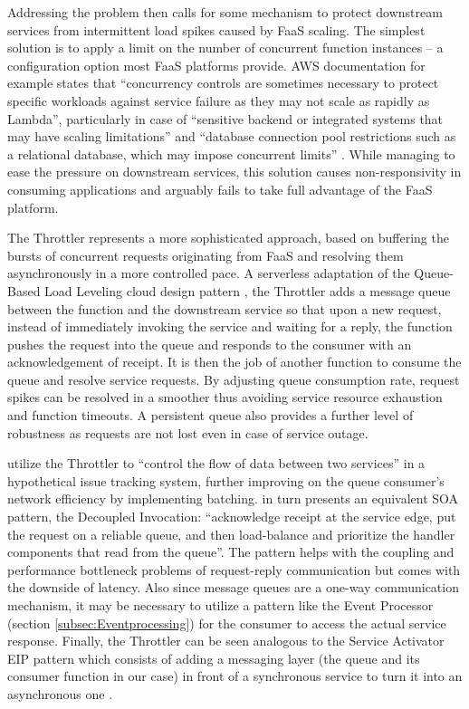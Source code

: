 Addressing the problem then calls for some mechanism to protect downstream services from intermittent load spikes caused by FaaS scaling. The simplest solution is to apply a limit on the number of concurrent function instances -- a configuration option most FaaS platforms provide. AWS documentation for example states that ``concurrency controls are sometimes necessary to protect specific workloads against service failure as they may not scale as rapidly as Lambda'', particularly in case of ``sensitive backend or integrated systems that may have scaling limitations'' and ``database connection pool restrictions such as a relational database, which may impose concurrent limits'' \parencite{aws18serverlessLens}. While managing to ease the pressure on downstream services, this solution causes non-responsivity in consuming applications and arguably fails to take full advantage of the FaaS platform.

The Throttler represents a more sophisticated approach, based on buffering the bursts of concurrent requests originating from FaaS and resolving them asynchronously in a more controlled pace. A serverless adaptation of the Queue-Based Load Leveling cloud design pattern \parencite{microsoft18cloudPatterns}, the Throttler adds a message queue between the function and the downstream service so that upon a new request, instead of immediately invoking the service and waiting for a reply, the function pushes the request into the queue and responds to the consumer with an acknowledgement of receipt. It is then the job of another function to consume the queue and resolve service requests. By adjusting queue consumption rate, request spikes can be resolved in a smoother thus avoiding service resource exhaustion and function timeouts. A persistent queue also provides a further level of robustness as requests are not lost even in case of service outage.

\textcite{baldini17currentTrends} utilize the Throttler to ``control the flow of data between two services'' in a hypothetical issue tracking system, further improving on the queue consumer's network efficiency by implementing batching. \textcite{rotem12soa} in turn presents an equivalent SOA pattern, the Decoupled Invocation: ``acknowledge receipt at the service edge, put the request on a reliable queue, and then load-balance and prioritize the handler components that read from the queue''. The pattern helps with the coupling and performance bottleneck problems of request-reply communication but comes with the downside of latency. Also since message queues are a one-way communication mechanism, it may be necessary to utilize a pattern like the Event Processor (section \ref{subsec:Eventprocessing}) for the consumer to access the actual service response. Finally, the Throttler can be seen analogous to the Service Activator EIP pattern which consists of adding a messaging layer (the queue and its consumer function in our case) in front of a synchronous service to turn it into an asynchronous one \parencite{hohpe2004enterprise}.

